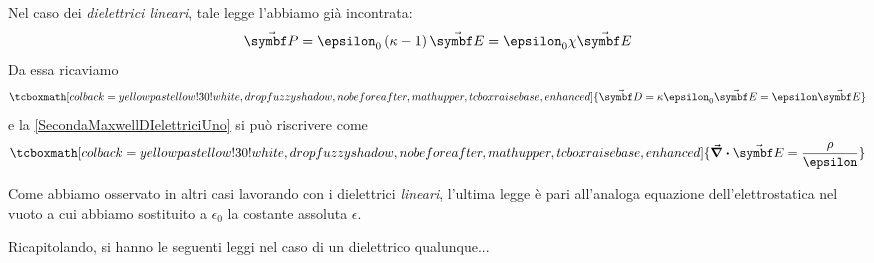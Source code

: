 Nel caso dei \textit{dielettrici lineari}, tale legge l'abbiamo già incontrata:
\begin{equation*}
	\vba{P}=\epsilon_0\left(\kappa-1\right)\vba{E}=\epsilon_0\chi\vba{E}
\end{equation*}
Da essa ricaviamo
\begin{equation}
	\tcboxmath[colback=yellowpastellow!30!white,drop fuzzy shadow, nobeforeafter, math upper, tcbox raise base, enhanced]{\vba{D}=\kappa\epsilon_0\vba{E}=\epsilon\vba{E}}
\end{equation}
e la \eqref{SecondaMaxwellDIelettriciUno} si può riscrivere come
\begin{equation}
	\tcboxmath[colback=yellowpastellow!30!white,drop fuzzy shadow, nobeforeafter, math upper, tcbox raise base, enhanced]{\div{\vba{E}}=\frac{\rho}{\epsilon}}
\end{equation} 
\begin{observe}
 Come abbiamo osservato in altri casi lavorando con i dielettrici \textit{lineari}, l'ultima legge è pari all'analoga equazione dell'elettrostatica nel vuoto a cui abbiamo sostituito a $\epsilon_0$ la costante assoluta $\epsilon$.
\end{observe}
Ricapitolando, si hanno le seguenti leggi nel caso di un dielettrico qualunque...

